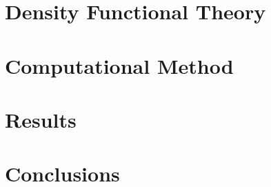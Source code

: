 \documentclass[12pt]{report}
\begin{document}
\chapter{Density Functional Theory} 

\newpage
\chapter{Computational Method}

\newpage
\chapter{Results}

\newpage
\chapter{Conclusions}
\newpage
%
%
%
\printbibliography
\end{document}
